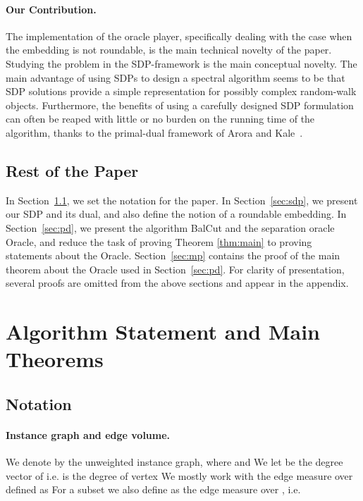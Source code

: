 \documentclass[twoside,leqno,twocolumn]{article}
\newcommand{\SDP}{{\sf SDP}\xspace}
\numberwithin{equation}{section}
\begin{document}
\paragraph{Our Contribution.}
The implementation of the oracle player, specifically dealing with the case when the embedding is not roundable,   is the main technical novelty of the paper. Studying the problem in the SDP-framework is the main conceptual novelty. 
The main advantage of using {\SDP}s to design a spectral algorithm seems to be that {\SDP} solutions provide a  simple representation for possibly complex random-walk objects. 
Furthermore, the benefits of using a carefully designed {\SDP} formulation can often  be reaped with little or no burden on the running time of the algorithm, thanks to the primal-dual framework of Arora and Kale~\cite{AK}.  


\subsection{Rest of the Paper}
In Section~\ref{sec:notation}, we set the notation for the paper. In Section~\ref{sec:sdp},  we present our {\SDP} and its dual, and also define the notion of a roundable embedding. In Section~\ref{sec:pd},  we present the algorithm {\sc BalCut} and the separation oracle {\sc Oracle}, and reduce the task of  proving  Theorem \ref{thm:main} to proving statements about the {\sc Oracle}. Section~\ref{sec:mp} contains the proof of the main theorem about the {\sc Oracle} used in Section~\ref{sec:pd}.  For clarity of presentation, several proofs are omitted from the above sections and appear in the appendix. 


\section{Algorithm Statement and Main Theorems}



\subsection{Notation} \label{sec:notation}


\paragraph{Instance graph and edge volume.} We denote by  the unweighted instance graph, where  and  We let  be the degree vector of  i.e.  is the degree of vertex  We mostly work with the edge measure  over  defined as  For a subset  we also define  as the edge measure over , i.e. 
\end{document}
